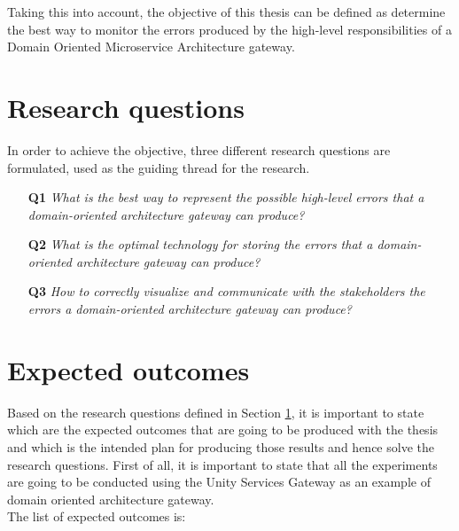 \documentclass[12pt]{article}
\begin{document}
Taking this into account, the objective of this thesis can be defined as determine the best way to monitor the errors produced by the high-level responsibilities of a Domain Oriented Microservice Architecture gateway. \\

\section{Research questions}
\label{sec:research-questions}

In order to achieve the objective, three different research questions are formulated, used as the guiding thread for the research.

\begin{itemize}
    \item[\textbf{Q1}] \textit{What is the best way to represent the possible high-level errors that a domain-oriented architecture gateway can produce?}
    \item[\textbf{Q2}] \textit{What is the optimal technology for storing the errors that a domain-oriented architecture gateway can produce?}
    \item[\textbf{Q3}] \textit{How to correctly visualize and communicate with the stakeholders the errors a domain-oriented architecture gateway can produce?}
\end{itemize}

\section{Expected outcomes}

Based on the research questions defined in Section \ref{sec:research-questions}, it is important to state which are the expected outcomes that are going to be produced with the thesis and which is the intended plan for producing those results and hence solve the research questions. First of all, it is important to state that all the experiments are going to be conducted using the Unity Services Gateway as an example of domain oriented architecture gateway.\\

The list of expected outcomes is:
\end{document}
